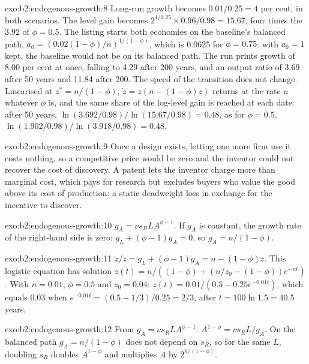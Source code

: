 \begin{solution}{exo:b2:endogenous-growth:8}
Long-run growth becomes $0.01/0.25 = 4$ per cent, in both scenarios. The level gain becomes $2^{1/0.25} \times 0.96/0.98 = 15.67$,
four times the 3.92 of $\phi = 0.5$. The listing starts both economies on the baseline's balanced path, $a_0 = (0.02(1 - \phi)/n)^{1/(1 - \phi)}$,
which is 0.0625 for $\phi = 0.75$: with $a_0 = 1$ kept, the baseline would not be on its balanced path. The run prints growth
of 8.00 per cent at once, falling to 4.29 after 200 years, and an output ratio of 3.69 after 50 years and 11.84 after 200.
The speed of the transition does not change. Linearised at $z^* = n/(1 - \phi)$, $\dot z = z(n - (1 - \phi)z)$ returns at the rate $n$ whatever $\phi$
is, and the same share of the log-level gain is reached at each date: after 50 years, $\ln(3.692/0.98)/\ln(15.67/0.98) = 0.48$, as
for $\phi = 0.5$, $\ln(1.902/0.98)/\ln(3.918/0.98) = 0.48$.
\end{solution}

\begin{solution}{exo:b2:endogenous-growth:9}
Once a design exists, letting one more firm use it costs nothing, so a competitive price would be zero and the inventor
could not recover the cost of discovery. A patent lets the inventor charge more than marginal cost, which pays for
research but excludes buyers who value the good above its cost of production: a static deadweight loss in exchange for
the incentive to discover.
\end{solution}

\begin{solution}{exo:b2:endogenous-growth:10}
$g_A = \nu s_RLA^{\phi - 1}$. If $g_A$ is constant, the growth rate of the right-hand side is zero: $g_L + (\phi - 1)g_A = 0$, so $g_A = n/(1 - \phi)$.
\end{solution}

\begin{solution}{exo:b2:endogenous-growth:11}
$\dot z/z = g_L + (\phi - 1)g_A = n - (1 - \phi)z$. This logistic equation has solution $z(t) = n/((1 - \phi) + (n/z_0 - (1 - \phi))e^{-nt})$. With $n = 0.01$, $\phi = 0.5$ and $z_0 = 0.04$: $z(t) = 0.01/(0.5 - 0.25e^{-0.01t})$, which equals 0.03 when
$e^{-0.01t} = (0.5 - 1/3)/0.25 = 2/3$, after $t = 100\ln 1.5 = 40.5$ years.
\end{solution}

\begin{solution}{exo:b2:endogenous-growth:12}
From $g_A = \nu s_RLA^{\phi - 1}$: $A^{1-\phi} = \nu s_RL/g_A$. On the balanced path $g_A = n/(1 - \phi)$ does not depend on $s_R$, so for the same $L$, doubling $s_R$ doubles $A^{1-\phi}$ and multiplies $A$ by $2^{1/(1-\phi)}$.
\end{solution}

